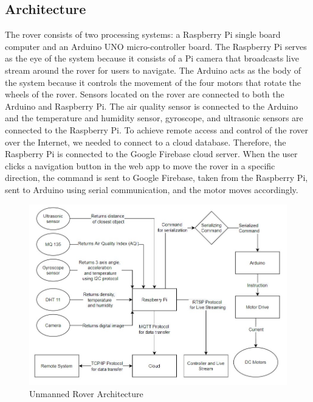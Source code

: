 \documentclass[conference,a4paper]{IEEEtran}
\begin{document}
\subsection{Architecture}
The rover consists of two processing systems: a Raspberry Pi single board computer and an Arduino UNO micro-controller board. The Raspberry Pi serves as the eye of the system because it consists of a Pi camera that broadcasts live stream around the rover for users to navigate. The Arduino acts as the body of the system because it controls the movement of the four motors that rotate the wheels of the rover. Sensors located on the rover are connected to both the Arduino and Raspberry Pi. The air quality sensor is connected to the Arduino and the temperature and humidity sensor, gyroscope, and  ultrasonic sensors are connected to the Raspberry Pi. To achieve remote access and control of the rover over the Internet, we needed to connect to a cloud database. Therefore, the Raspberry Pi is connected to the Google Firebase cloud server. When the user clicks a navigation button in the web app to move the rover  in a specific direction, the command is sent to Google Firebase, taken from the Raspberry Pi, sent to Arduino using serial communication, and the motor moves accordingly.
\begin{figure}[ht]
\centering
\includegraphics[width=1\linewidth]{architecture.jpeg}
\caption{Unmanned Rover Architecture}
\label{Fig: Arch}
\end{figure}
\end{document}
